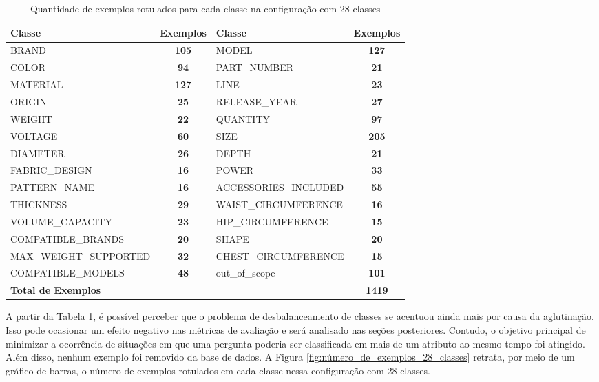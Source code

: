 \begin{table}[!ht]
\caption{Quantidade de exemplos rotulados para cada classe na configuração com 28 classes}
\label{table:nova_divisão_de_classes}
\tiny %
\begin{tabularx}{\textwidth}{|X|c|X|c|}
 \hline
 \textbf{Classe} & \textbf{Exemplos} & \textbf{Classe} & \textbf{Exemplos} \\
 \hline
 BRAND & \textbf{105} & MODEL & \textbf{127} \\
 \hline
 COLOR & \textbf{94} & PART\_NUMBER & \textbf{21} \\
 \hline
 MATERIAL & \textbf{127} & LINE & \textbf{23} \\
 \hline
 ORIGIN & \textbf{25} & RELEASE\_YEAR & \textbf{27} \\
 \hline
 WEIGHT & \textbf{22} & QUANTITY & \textbf{97} \\
 \hline
 VOLTAGE & \textbf{60} & SIZE & \textbf{205} \\
 \hline
 DIAMETER & \textbf{26} & DEPTH & \textbf{21} \\
 \hline
 FABRIC\_DESIGN & \textbf{16} & POWER & \textbf{33} \\
 \hline
 PATTERN\_NAME & \textbf{16} & ACCESSORIES\_INCLUDED & \textbf{55} \\
 \hline
 THICKNESS & \textbf{29} & WAIST\_CIRCUMFERENCE & \textbf{16} \\
 \hline
 VOLUME\_CAPACITY & \textbf{23} & HIP\_CIRCUMFERENCE & \textbf{15} \\
 \hline
 COMPATIBLE\_BRANDS & \textbf{20} & SHAPE & \textbf{20} \\
 \hline
 MAX\_WEIGHT\_SUPPORTED & \textbf{32} & CHEST\_CIRCUMFERENCE & \textbf{15} \\
 \hline
 COMPATIBLE\_MODELS & \textbf{48} & out\_of\_scope & \textbf{101} \\
 \hline
 \multicolumn{3}{|l|}{\textbf{Total de Exemplos}} & \textbf{1419} \\
 \hline
\end{tabularx}
\end{table}

A partir da Tabela \ref{table:nova_divisão_de_classes}, é possível perceber que o problema de desbalanceamento de classes se acentuou ainda mais por causa da aglutinação. Isso pode ocasionar um efeito negativo nas métricas de avaliação e será analisado nas seções posteriores. Contudo, o objetivo principal de minimizar a ocorrência de situações em que uma pergunta poderia ser classificada em mais de um atributo ao mesmo tempo foi atingido. Além disso, nenhum exemplo foi removido da base de dados. A Figura \ref{fig:número_de_exemplos_28_classes} retrata, por meio de um gráfico de barras, o número de exemplos rotulados em cada classe nessa configuração com 28 classes.


